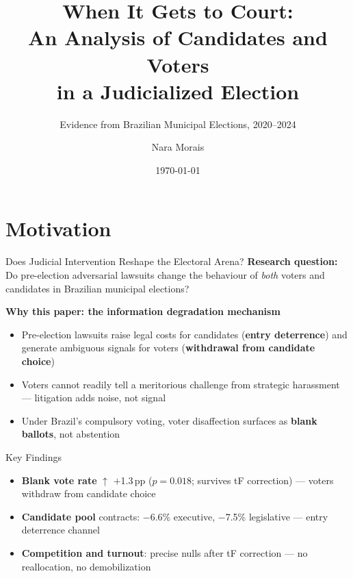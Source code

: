 \documentclass[aspectratio=169,10pt]{beamer}
\title{When It Gets to Court:\\An Analysis of Candidates and Voters\\in a Judicialized Election}
\subtitle{Evidence from Brazilian Municipal Elections, 2020--2024}
\author{Nara Morais}
\institute{FEA--USP}
\date{\today}
\begin{document}

\maketitle

\section{Motivation}

\begin{frame}{Does Judicial Intervention Reshape the Electoral Arena?}
\textbf{Research question:}\\
Do pre-election adversarial lawsuits change the behaviour of \emph{both} voters and candidates in Brazilian municipal elections?
\bigskip

\textbf{Why this paper: the information degradation mechanism}
\begin{itemize}
  \item Pre-election lawsuits raise legal costs for candidates (\textbf{entry deterrence}) and generate ambiguous signals for voters (\textbf{withdrawal from candidate choice})
  \item Voters cannot readily tell a meritorious challenge from strategic harassment --- litigation adds noise, not signal
  \item Under Brazil's compulsory voting, voter disaffection surfaces as \textbf{blank ballots}, not abstention
\end{itemize}
\medskip

\begin{alertblock}{Key Findings }
\footnotesize
\begin{itemize}
  \item \textbf{Blank vote rate} $\uparrow$ $+$1.3\,pp ($p=0.018$; survives tF correction) --- voters withdraw from candidate choice
  \item \textbf{Candidate pool} contracts: $-$6.6\% executive, $-$7.5\% legislative --- entry deterrence channel
  \item \textbf{Competition and turnout}: precise nulls after tF correction --- no reallocation, no demobilization
\end{itemize}
\end{alertblock}
\end{frame}
\end{document}
